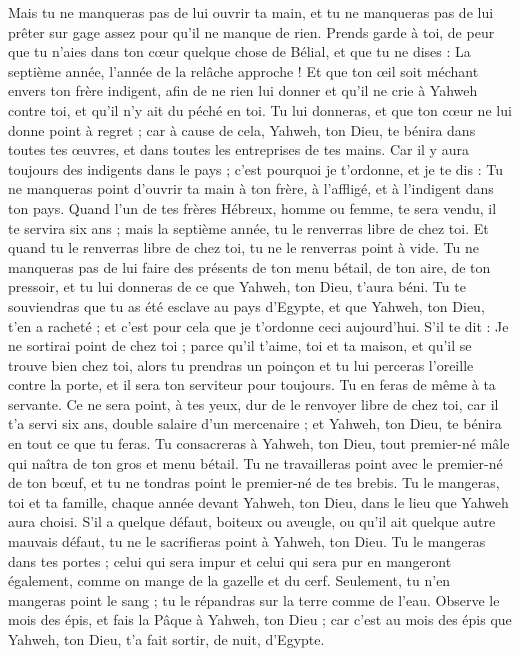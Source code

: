 \begin{multicols}{2}
Mais tu ne manqueras pas de lui ouvrir ta main, et tu ne manqueras pas de lui prêter sur gage assez pour qu’il ne manque de rien.
Prends garde à toi, de peur que tu n'aies dans ton cœur quelque chose de Bélial, et que tu ne dises : La septième année, l'année de la relâche approche ! Et que ton œil soit méchant envers ton frère indigent, afin de ne rien lui donner et qu’il ne crie à Yahweh contre toi, et qu'il n'y ait du péché en toi.
Tu lui donneras, et que ton cœur ne lui donne point à regret ; car à cause de cela, Yahweh, ton Dieu, te bénira dans toutes tes œuvres, et dans toutes les entreprises de tes mains.
Car il y aura toujours des indigents dans le pays ; c'est pourquoi je t’ordonne, et je te dis : Tu ne manqueras point d'ouvrir ta main à ton frère, à l'affligé, et à l’indigent dans ton pays.
Quand l’un de tes frères Hébreux, homme ou femme, te sera vendu, il te servira six ans ; mais la septième année, tu le renverras libre de chez toi.
Et quand tu le renverras libre de chez toi, tu ne le renverras point à vide.
Tu ne manqueras pas de lui faire des présents de ton menu bétail, de ton aire, de ton pressoir, et tu lui donneras de ce que Yahweh, ton Dieu, t'aura béni.
Tu te souviendras que tu as été esclave au pays d'Egypte, et que Yahweh, ton Dieu, t'en a racheté ; et c'est pour cela que je t’ordonne ceci aujourd'hui.
S’il te dit : Je ne sortirai point de chez toi ; parce qu'il t'aime, toi et ta maison, et qu'il se trouve bien chez toi,
alors tu prendras un poinçon et tu lui perceras l'oreille contre la porte, et il sera ton serviteur pour toujours. Tu en feras de même à ta servante.
Ce ne sera point, à tes yeux, dur de le renvoyer libre de chez toi, car il t'a servi six ans, double salaire d’un mercenaire ; et Yahweh, ton Dieu, te bénira en tout ce que tu feras.
Tu consacreras à Yahweh, ton Dieu, tout premier-né mâle qui naîtra de ton gros et menu bétail. Tu ne travailleras point avec le premier-né de ton bœuf, et tu ne tondras point le premier-né de tes brebis.
Tu le mangeras, toi et ta famille, chaque année devant Yahweh, ton Dieu, dans le lieu que Yahweh aura choisi.
S'il a quelque défaut, boiteux ou aveugle, ou qu'il ait quelque autre mauvais défaut, tu ne le sacrifieras point à Yahweh, ton Dieu.
Tu le mangeras dans tes portes ; celui qui sera impur et celui qui sera pur en mangeront également, comme on mange de la gazelle et du cerf.
Seulement, tu n'en mangeras point le sang ; tu le répandras sur la terre comme de l'eau.
\VerseOne{}Observe le mois des épis, et fais la Pâque à Yahweh, ton Dieu ; car c’est au mois des épis que Yahweh, ton Dieu, t'a fait sortir, de nuit, d’Egypte.

\end{multicols}
